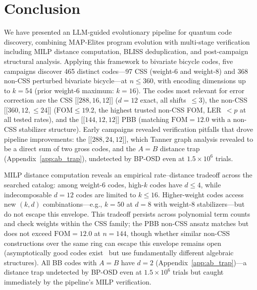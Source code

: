\documentclass[aps,prxquantum,twocolumn,superscriptaddress,nofootinbib]{revtex4-2}
\newcommand{\dblbrk}[1]{\ensuremath{\lbrack\!\lbrack #1 \rbrack\!\rbrack}}
\newcommand{\code}[1]{\dblbrk{#1}}
\newcommand{\FOM}{\ensuremath{\mathrm{FOM}}}
\begin{document}
\section{Conclusion}
\label{sec:conclusion}

We have presented an LLM-guided evolutionary pipeline for quantum code discovery, combining MAP-Elites program evolution with multi-stage verification including MILP distance computation, BLISS deduplication, and post-campaign structural analysis.
Applying this framework to bivariate bicycle codes, five campaigns discover 465 distinct codes---97 CSS (weight-6 and weight-8) and 368 non-CSS perturbed bivariate bicycle---at $n \leq 360$, with encoding dimensions up to $k = 54$ (prior weight-6 maximum: $k = 16$).
The codes most relevant for error correction are the CSS $\code{288,16,12}$ ($d = 12$ exact, all shifts~$\leq 3$), the non-CSS $\code{360,12,{\leq}24}$ ($\FOM \leq 19.2$, the highest trusted non-CSS FOM, LER~$< p$ at all tested rates), and the $\code{144,12,12}$ PBB (matching $\FOM = 12.0$ with a non-CSS stabilizer structure).
Early campaigns revealed verification pitfalls that drove pipeline improvements: the $\code{288,24,12}$, which Tanner graph analysis revealed to be a direct sum of two gross codes, and the $A{=}B$ distance trap (Appendix~\ref{app:ab_trap}), undetected by BP-OSD even at $1.5 \times 10^6$ trials. 

MILP distance computation reveals an empirical rate--distance tradeoff across the searched catalog: among weight-6 codes, high-$k$ codes have $d \leq 4$, while indecomposable $d = 12$ codes are limited to $k \leq 16$.
Higher-weight codes access new $(k,d)$ combinations---e.g., $k = 50$ at $d = 8$ with weight-8 stabilizers---but do not escape this envelope.
This tradeoff persists across polynomial term counts and check weights within the CSS family; the PBB non-CSS ansatz matches but does not exceed $\FOM = 12.0$ at $n = 144$, though whether similar non-CSS constructions over the same ring can escape this envelope remains open (asymptotically good codes exist~\cite{panteleev2022asymptotically,leverrier2022quantum,dinur2023good} but use fundamentally different algebraic structures).
All BB codes with $A = B$ have $d = 2$ (Appendix~\ref{app:ab_trap})---a distance trap undetected by BP-OSD even at $1.5 \times 10^6$ trials but caught immediately by the pipeline's MILP verification. 
\end{document}
